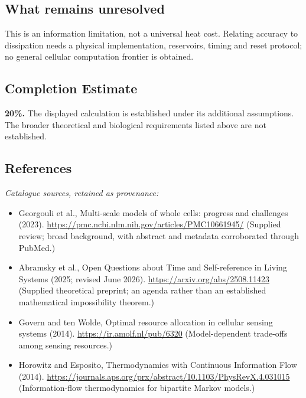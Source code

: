 \documentclass[11pt]{article}
\begin{document}
\subsection{What remains unresolved}
This is an information limitation, not a universal heat cost. Relating accuracy to dissipation needs a physical implementation, reservoirs, timing and reset protocol; no general cellular computation frontier is obtained.
\subsection{Completion Estimate}
\textbf{20\%.} The displayed calculation is established under its additional assumptions. The broader theoretical and biological requirements listed above are not established.
\subsection{References}
\noindent\emph{Catalogue sources, retained as provenance:}
\begin{itemize}
\item Georgouli et al., Multi-scale models of whole cells: progress and challenges (2023). \url{https://pmc.ncbi.nlm.nih.gov/articles/PMC10661945/} (Supplied review; broad background, with abstract and metadata corroborated through PubMed.)
\item Abramsky et al., Open Questions about Time and Self-reference in Living Systems (2025; revised June 2026). \url{https://arxiv.org/abs/2508.11423} (Supplied theoretical preprint; an agenda rather than an established mathematical impossibility theorem.)
\item Govern and ten Wolde, Optimal resource allocation in cellular sensing systems (2014). \url{https://ir.amolf.nl/pub/6320} (Model-dependent trade-offs among sensing resources.)
\item Horowitz and Esposito, Thermodynamics with Continuous Information Flow (2014). \url{https://journals.aps.org/prx/abstract/10.1103/PhysRevX.4.031015} (Information-flow thermodynamics for bipartite Markov models.)
\end{itemize}
\clearpage


\appendix
\end{document}
